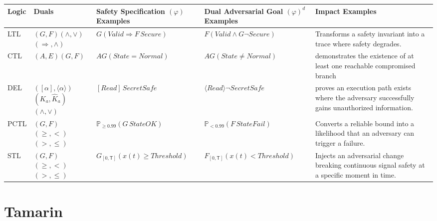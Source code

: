 \documentclass[11pt]{amsart}
\theoremstyle{definition}
\theoremstyle{remark}
\begin{document}
\begingroup
\small
\renewcommand{\arraystretch}{1.4}
\begin{longtable}{L{1.8cm} L{2.6cm} L{3.4cm} L{3.4cm} L{3.4cm}}
\toprule
\textbf{Logic} & \textbf{Duals} & \textbf{Safety Specification} $(\varphi)$ Examples & \textbf{Dual Adversarial Goal} $(\varphi)^{d}$ Examples & \textbf{Impact Examples} \\
\midrule
\endhead
LTL &
$(G, F)$\newline $(\wedge, \vee)$\newline $(\Rightarrow, \wedge)$ &
$G(\mathit{Valid} \Rightarrow F\,\mathit{Secure})$ &
$F(\mathit{Valid} \wedge G\neg \mathit{Secure})$ &
Transforms a safety invariant into a trace where safety degrades. \\
\addlinespace
CTL &
$(A, E)$\newline $(G, F)$ &
$AG(\mathit{State} = \mathit{Normal})$ &
$AG(\mathit{State} \neq \mathit{Normal})$ &
demonstrates the existence of at least one reachable compromised branch \\
\addlinespace
DEL &
$([\alpha], \langle\alpha\rangle)$\newline $(K_a, \hat{K}_a)$\newline $(\wedge, \vee)$ &
$[\mathit{Read}]\,\mathit{SecretSafe}$ &
$\langle \mathit{Read} \rangle \neg \mathit{SecretSafe}$ &
proves an execution path exists where the adversary successfully gains unauthorized information. \\
\addlinespace
PCTL &
$(G, F)$\newline $(\geq, <)$\newline $(>, \leq)$ &
$\mathbb{P}_{\geq 0.99}(G\,\mathit{StateOK})$ &
$\mathbb{P}_{<0.99}(F\,\mathit{StateFail})$ &
Converts a reliable bound into a likelihood that an adversary can trigger a failure. \\
\addlinespace
STL &
$(G, F)$\newline $(\geq, <)$\newline $(>, \leq)$ &
$G_{[0,\mathsf{T}]}(x(t) \geq \mathit{Threshold})$ &
$F_{[0,\mathsf{T}]}(x(t) < \mathit{Threshold})$ &
Injects an adversarial change breaking continuous signal safety at a specific moment in time. \\
\bottomrule
\end{longtable}
\endgroup

\section{Tamarin}
\end{document}
